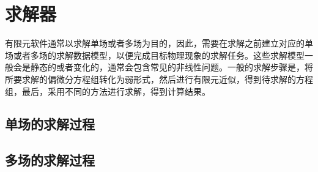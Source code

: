 \chapter{求解器}
有限元软件通常以求解单场或者多场为目的，因此，需要在求解之前建立对应的单场或者多场的求解数据模型，以便完成目标物理现象的求解任务。这些求解模型一般会是静态的或者变化的，通常会包含常见的非线性问题。一般的求解步骤是，将所要求解的偏微分方程组转化为弱形式，然后进行有限元近似，得到待求解的方程组，最后，采用不同的方法进行求解，得到计算结果。
\section{单场的求解过程}

\section{多场的求解过程}

